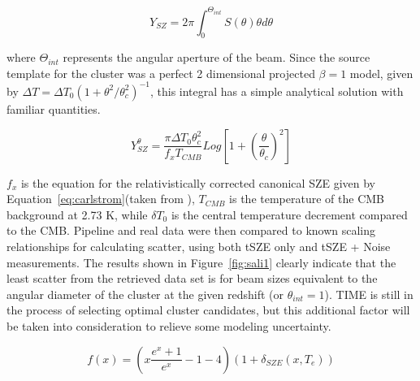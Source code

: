 \documentclass[manuscript]{aastex}
\begin{document}
\begin{equation}
Y_{SZ} = 2\pi \int_{0}^{\Theta_{int}} S(\theta) \theta d\theta
\end{equation}

where $\Theta_{int}$ represents the angular aperture of the beam. Since the source template for the cluster was a perfect 2 dimensional projected $\beta = 1$ model, given by $\Delta T = \Delta T_{0}(1 + \theta^{2}/\theta_{c}^{2})^{-1}$, this integral has a simple analytical solution with familiar quantities. 

\begin{equation}
Y_{SZ}^{\theta} = \frac{\pi \Delta T_{0} \theta_{c}^{2}}{f_{x} T_{CMB}} Log[1 + (\frac{\theta}{\theta_{c}})^{2}]
\end{equation}

$f_{x}$ is the equation for the relativistically corrected canonical SZE given by Equation~\ref{eq:carlstrom}(taken from \cite{Carlstrom2002}), $T_{CMB}$ is the temperature of the CMB background at 2.73 K, while $\delta T_{0}$ is the central temperature decrement compared to the CMB. Pipeline and real data were then compared to known scaling relationships for calculating scatter, using both tSZE only and tSZE + Noise measurements. The results shown in Figure~\ref{fig:sali1} clearly indicate that the least scatter from the retrieved data set is for beam sizes equivalent to the angular diameter of the cluster at the given redshift (or \(\theta_{int} = 1\)). TIME is still in the process of selecting optimal cluster candidates, but this additional factor will be taken into consideration to relieve some modeling uncertainty.  

\begin{equation}\label{eq:carlstrom}
f(x) = (x\frac{e^{x}+1}{e^{x}}-1 - 4)(1 + \delta_{SZE}(x,T_{e}))
\end{equation}
\end{document}
